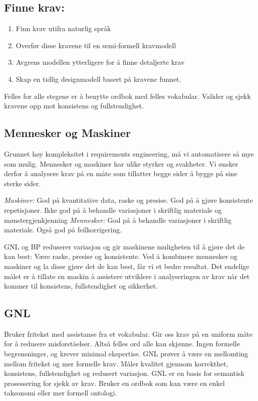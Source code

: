 \subsection{Finne krav:}

\begin{enumerate}[1.]
\item
  Finn krav utifra naturlig språk
\item
  Overfør disse kravene til en semi-formell kravmodell
\item
  Avgrens modellen ytterligere for å finne detaljerte krav
\item
  Skap en tidlig designmodell basert på kravene funnet.
\end{enumerate}
Felles for alle stegene er å benytte ordbok med felles vokabular.
Valider og sjekk kravene opp mot konsistens og fullstendighet.

\subsection{Mennesker og Maskiner}

Grunnet høy kompleksitet i requirements engineering, må vi automatisere
så mye som mulig. Mennesker og maskiner har ulike styrker og svakheter.
Vi ønsker derfor å analysere krav på en måte som tillatter begge sider å
bygge på sine sterke sider.

\emph{Maskiner:} God på kvantitative data, raske og presise. God på å
gjøre konsistente repetisjoner. Ikke god på å behandle variasjoner i
skriftlig materiale og mønstergjenkjenning \emph{Mennesker:} God på å
behandle variasjoner i skriftlig materiale. Også god på feilkorrigering.

GNL og BP reduserer variasjon og gir maskinene muligheten til å gjøre
det de kan best: Være raske, presise og konsistente. Ved å kombinere
mennesker og maskiner og la disse gjøre det de kan best, får vi et bedre
resultat. Det endelige målet er å tillate en maskin å assistere
utviklere i analyseringen av krav når det kommer til konsistens,
fullstendighet og sikkerhet.

\subsection{GNL}

Bruker fritekst med assistanse fra et vokabular. Gir oss krav på en
uniform måte for å redusere misforståelser. Altså felles ord alle kan
skjønne. Ingen formelle begrensninger, og krever minimal ekspertise. GNL
prøver å være en mellomting mellom fritekst og mer formelle krav. Måler
kvalitet gjennom korrekthet, konsistens, fullstendighet og redusert
variasjon. GNL er en basis for semantisk prosessering for sjekk av krav.
Bruker en ordbok som kan være en enkel taksonomi eller mer formell
ontologi.

